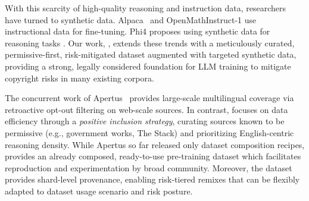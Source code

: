 With this scarcity of high-quality reasoning and instruction data, researchers have turned to synthetic data. Alpaca~\citep{taori2023alpaca} and OpenMathInstruct-1 \citep{toshniwal2024openmathinstruct} use instructional data for fine-tuning. Phi4 proposes using synthetic data for reasoning tasks \citep{abdin2024phi4technicalreport}. Our work, \MixtureVitae{}, extends these trends with a meticulously curated, permissive-first, risk-mitigated dataset augmented with targeted synthetic data, providing a strong, legally considered foundation for LLM training to mitigate copyright risks in many existing corpora.

The concurrent work of Apertus~\citep{apertus2025apertusdemocratizingopencompliant} provides large-scale multilingual coverage via retroactive opt-out filtering on web-scale sources. In contrast, \MixtureVitae{} focuses on data efficiency through a \textit{positive inclusion strategy}, curating sources known to be permissive (e.g., government works, The Stack) and prioritizing English-centric reasoning density. While Apertus so far released only dataset composition recipes, \MixtureVitae{} provides an already composed, ready-to-use pre-training dataset which facilitates reproduction and experimentation by broad community. Moreover, the dataset provides shard-level provenance, enabling risk-tiered remixes that can be flexibly adapted to dataset usage scenario and risk posture.







